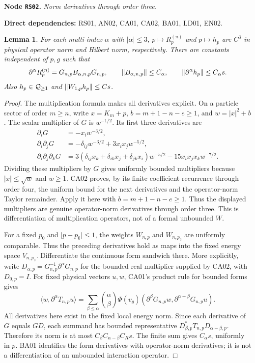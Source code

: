 \documentclass[11pt,a4paper]{article}
\newtheorem{lemma}[theorem]{Lemma}
\theoremstyle{remark}\newtheorem{remark}[theorem]{Remark}
\newcommand{\abs}[1]{\lvert #1\rvert}\newcommand{\rankone}[2]{\lvert #1\rangle\langle #2\rvert}
\newcommand{\node}[3]{\par\Needspace{6\baselineskip}\smallskip\hypertarget{node:#1}{}\label{nodepage:#1}\noindent\textbf{Node \texttt{#1}.} \textit{#2.}\par\noindent\textbf{Direct dependencies:} #3.\par}
\begin{document}
\node{RS02}{Norm derivatives through order three}{RS01, AN02, CA01, CA02, BA01, LD01, EN02}
\begin{lemma}\label{lem:derivatives}
For each multi-index $\alpha$ with $\abs\alpha\leq3$, $p\mapsto R_p^{(n)}$ and $p\mapsto h_p$ are $C^3$ in physical operator norm and Hilbert norm, respectively. There are constants independent of $p,g$ such that
\[
 \partial^\alpha R_p^{(n)}=G_{n,p}B_{\alpha,n,p}G_{n,p},\qquad
 \lVert B_{\alpha,n,p}\rVert\leq C_\alpha,
 \qquad\lVert \partial^\alpha h_p\rVert\leq C_\alpha s.
\]
Also $h_p\in\mathcal Q_{\geq1}$ and $\lVert W_{1,p}h_p\rVert\leq Cs$.
\end{lemma}
\begin{proof}
The multiplication formula makes all derivatives explicit. On a particle sector of order $m\geq n$, write $x=K_m+p$, $b=m+1-n-e\geq1$, and $w=\abs x^2+b$. The scalar multiplier of $G$ is $w^{-1/2}$. Its first three derivatives are
\begin{align*}
 \partial_iG&=-x_iw^{-3/2},\\
 \partial_i\partial_jG&=-\delta_{ij}w^{-3/2}+3x_ix_jw^{-5/2},\\
 \partial_i\partial_j\partial_kG
 &=3(\delta_{ij}x_k+\delta_{ik}x_j+\delta_{jk}x_i)w^{-5/2}
   -15x_ix_jx_kw^{-7/2}.
\end{align*}
Dividing these multipliers by $G$ gives uniformly bounded multipliers because $\abs x\leq\sqrt w$ and $w\geq1$. CA02 proves, by its finite coefficient recurrence through order four, the uniform bound for the next derivatives and the operator-norm Taylor remainder. Apply it here with $b=m+1-n-e\geq1$. Thus the displayed multipliers are genuine operator-norm derivatives through order three. This is differentiation of multiplication operators, not of a formal unbounded $W$.

For a fixed $p_0$ and $\abs{p-p_0}\leq1$, the weights $W_{n,p}$ and $W_{n,p_0}$ are uniformly comparable. Thus the preceding derivatives hold as maps into the fixed energy space $V_{n,p_0}$. Differentiate the continuous form sandwich there. More explicitly, write $D_{\alpha,p}=G_{n,p}^{-1}\partial^\alpha G_{n,p}$ for the bounded real multiplier supplied by CA02, with $D_{0,p}=I$. For fixed physical vectors $u,w$, CA01's product rule for bounded forms gives
\[
 \langle w,\partial^\alpha T_{n,p}u\rangle
 =\sum_{\beta\leq\alpha}\binom{\alpha}{\beta}
  \Phi(v_g)(\partial^\beta G_{n,p}w,
                  \partial^{\alpha-\beta}G_{n,p}u).
\]
All derivatives here exist in the fixed local energy norm. Since each derivative of $G$ equals $G D$, each summand has bounded representative
$D_{\beta,p}^* T_{n,p}D_{\alpha-\beta,p}$. Therefore its norm is at most
$C_\beta C_{\alpha-\beta}C_Rs$. The finite sum gives $C_\alpha s$, uniformly in $p$. BA01 identifies the form derivatives with operator-norm derivatives; it is not a differentiation of an unbounded interaction operator.


\end{proof}
\end{document}
